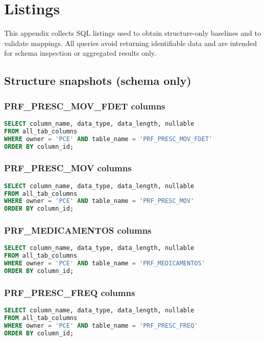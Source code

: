 \chapter{Listings}
\label{app:listings}

This appendix collects SQL listings used to obtain structure-only baselines and to validate mappings. All queries avoid returning identifiable data and are intended for schema inspection or aggregated results only.

\section{Structure snapshots (schema only)}
\subsection*{PRF\_PRESC\_MOV\_FDET columns}
\begin{lstlisting}[language=SQL]
SELECT column_name, data_type, data_length, nullable
FROM all_tab_columns
WHERE owner = 'PCE' AND table_name = 'PRF_PRESC_MOV_FDET'
ORDER BY column_id;
\end{lstlisting}

\subsection*{PRF\_PRESC\_MOV columns}
\begin{lstlisting}[language=SQL]
SELECT column_name, data_type, data_length, nullable
FROM all_tab_columns
WHERE owner = 'PCE' AND table_name = 'PRF_PRESC_MOV'
ORDER BY column_id;
\end{lstlisting}

\subsection*{PRF\_MEDICAMENTOS columns}
\begin{lstlisting}[language=SQL]
SELECT column_name, data_type, data_length, nullable
FROM all_tab_columns
WHERE owner = 'PCE' AND table_name = 'PRF_MEDICAMENTOS'
ORDER BY column_id;
\end{lstlisting}

\subsection*{PRF\_PRESC\_FREQ columns}
\begin{lstlisting}[language=SQL]
SELECT column_name, data_type, data_length, nullable
FROM all_tab_columns
WHERE owner = 'PCE' AND table_name = 'PRF_PRESC_FREQ'
ORDER BY column_id;
\end{lstlisting}

